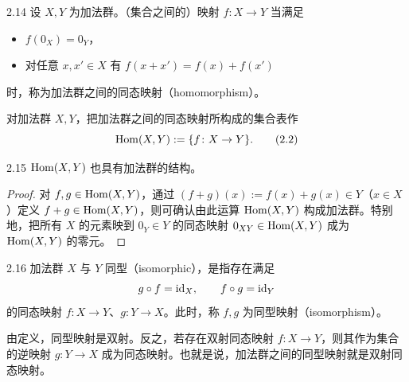 \begin{definition}{2.14} 设 $X,Y$ 为加法群。（集合之间的）映射 $f\colon X\to Y$ 当满足
\begin{itemize}
  \item $f(0_X)=0_Y$，
  \item 对任意 $x,x'\in X$ 有 $f(x+x')=f(x)+f(x')$
\end{itemize}
时，称为加法群之间的同态映射（homomorphism）。\end{definition}


对加法群 $X,Y$，把加法群之间的同态映射所构成的集合表作
\begin{equation}
  \operatorname{Hom}(X,Y) := \{f\colon X\to Y\}. \tag{2.2}
\end{equation}

\begin{lemma}{2.15} $\operatorname{Hom}(X,Y)$ 也具有加法群的结构。\end{lemma}

\begin{proof}
对 $f,g\in\operatorname{Hom}(X,Y)$，通过 $(f+g)(x):=f(x)+g(x)\in Y$（$x\in X$）定义 $f+g\in\operatorname{Hom}(X,Y)$，则可确认由此运算 $\operatorname{Hom}(X,Y)$ 构成加法群。特别地，把所有 $X$ 的元素映到 $0_Y\in Y$ 的同态映射 $0_{XY}\in\operatorname{Hom}(X,Y)$ 成为 $\operatorname{Hom}(X,Y)$ 的零元。
\end{proof}


\begin{definition}{2.16} 加法群 $X$ 与 $Y$ 同型（isomorphic），是指存在满足
\[
  g\circ f=\mathrm{id}_X,\qquad f\circ g=\mathrm{id}_Y
\]
的同态映射 $f\colon X\to Y$、$g\colon Y\to X$。此时，称 $f,g$ 为同型映射（isomorphism）。\end{definition}

由定义，同型映射是双射。反之，若存在双射同态映射 $f\colon X\to Y$，则其作为集合的逆映射 $g\colon Y\to X$ 成为同态映射。也就是说，加法群之间的同型映射就是双射同态映射。

